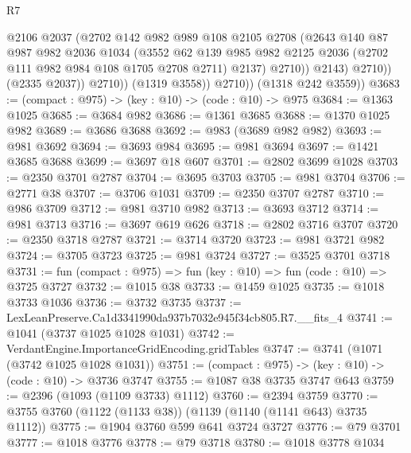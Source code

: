 \begin{lexlean}{R7}
\begin{coremodule}
                        @2106
                        @2037
                        (@2702
                          @142
                          @982
                          @989
                          @108
                          @2105
                          @2708
                          (@2643
                            @140
                            @87
                            @987
                            @982
                            @2036
                            @1034
                            (@3552
                              @62
                              @139
                              @985
                              @982
                              @2125
                              @2036
                              (@2702 @111 @982 @984 @108 @1705 @2708 @2711)
                              @2137)
                            @2710))
                        @2143)
                      @2710))
                  (@2335 @2037))
                @2710))
            (@1319 @3558))
          @2710))
      (@1318 @242 @3559))
@3683 := (compact : @975) -> (key : @10) -> (code : @10) -> @975
@3684 := @1363 @1025
@3685 := @3684 @982
@3686 := @1361 @3685
@3688 := @1370 @1025 @982
@3689 := @3686 @3688
@3692 := @983 (@3689 @982 @982)
@3693 := @981 @3692
@3694 := @3693 @984
@3695 := @981 @3694
@3697 := @1421 @3685 @3688
@3699 := @3697 @18 @607
@3701 := @2802 @3699 @1028
@3703 := @2350 @3701 @2787
@3704 := @3695 @3703
@3705 := @981 @3704
@3706 := @2771 @38
@3707 := @3706 @1031
@3709 := @2350 @3707 @2787
@3710 := @986 @3709
@3712 := @981 @3710 @982
@3713 := @3693 @3712
@3714 := @981 @3713
@3716 := @3697 @619 @626
@3718 := @2802 @3716 @3707
@3720 := @2350 @3718 @2787
@3721 := @3714 @3720
@3723 := @981 @3721 @982
@3724 := @3705 @3723
@3725 := @981 @3724
@3727 := @3525 @3701 @3718
@3731 := fun (compact : @975) => fun (key : @10) => fun (code : @10) => @3725 @3727
@3732 := @1015 @38
@3733 := @1459 @1025
@3735 := @1018 @3733 @1036
@3736 := @3732 @3735
@3737 := LexLeanPreserve.Ca1d3341990da937b7032e945f34cb805.R7.__fits_4
@3741 := @1041 (@3737 @1025 @1028 @1031)
@3742 := VerdantEngine.ImportanceGridEncoding.gridTables
@3747 := @3741 (@1071 (@3742 @1025 @1028 @1031))
@3751 := (compact : @975) -> (key : @10) -> (code : @10) -> @3736 @3747
@3755 := @1087 @38 @3735 @3747 @643
@3759 := @2396 (@1093 (@1109 @3733) @1112)
@3760 := @2394 @3759
@3770 := @3755 @3760 (@1122 (@1133 @38)) (@1139 (@1140 (@1141 @643) @3735 @1112))
@3775 := @1904 @3760 @599 @641 @3724 @3727
@3776 := @79 @3701
@3777 := @1018 @3776
@3778 := @79 @3718
@3780 := @1018 @3778 @1034

\end{coremodule}
\end{lexlean}
